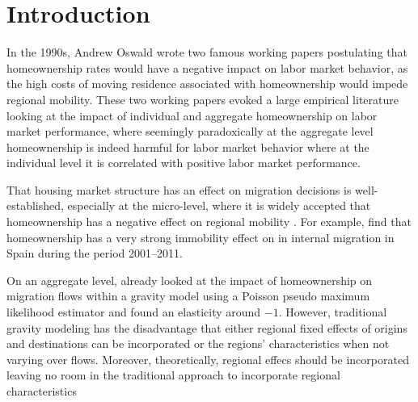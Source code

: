 \documentclass[fleqn,10pt]{SelfArx} %
\affiliation{\textsuperscript{1}\textit{Department of Spatial Economics, Vrije Universiteit Amsterdam, Amsterdam, The Netherlands}} %
\affiliation{*\textbf{Corresponding author}: \Letter{} t.de.graaff@vu.n; \Mundus{} \href{thomasdegraaff.nl}{thomasdegraaff.nl}} %
\begin{document}
	
	\flushbottom %
	\maketitle %
	\thispagestyle{empty} %
	
	
	\section{Introduction} %

        In the 1990s, Andrew Oswald wrote two famous working papers
        \citep{oswald1996conjecture, oswald1999housing} postulating
        that homeownership rates would have a negative impact on labor
        market behavior, as the high costs of moving residence
        associated with homeownership would impede regional
        mobility. These two working papers evoked a large empirical
        literature \citep[see, e.g., ][]{munch2006homeowners,
          munch2008home, de2013european} looking at the impact of
        individual and aggregate homeownership on labor market
        performance, where seemingly paradoxically at the aggregate
        level homeownership is indeed harmful for labor market
        behavior where at the individual level it is correlated with
        positive labor market performance.

        That housing market structure has an effect on migration
        decisions is well-established, especially at the micro-level,
        where it is widely accepted that homeownership has a negative
        effect on regional mobility \citep{dietz2003social}. For
        example, \citet{palomares2018understanding} find that
        homeownership has a very strong immobility effect on in
        internal migration in Spain during the period 2001--2011.

        On an aggregate level, \citet{amirault2016drags} already
        looked at the impact of homeownership on migration flows
        within a gravity model using a Poisson pseudo maximum
        likelihood estimator and found an elasticity around
        $-1$. However, traditional gravity modeling has the
        disadvantage that either regional fixed effects of origins and
        destinations can be incorporated or the regions'
        characteristics when not varying over flows. Moreover,
        theoretically, regional effecs should be incorporated leaving
        no room in the traditional approach to incorporate regional characteristics
\end{document}

